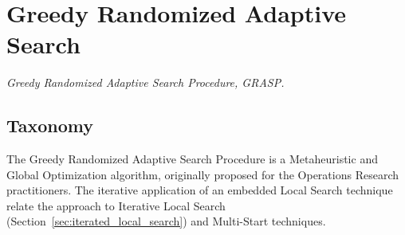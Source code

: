 

\section{Greedy Randomized Adaptive Search} 
\label{sec:grasp}

\emph{Greedy Randomized Adaptive Search Procedure, GRASP.}

\subsection{Taxonomy}
The Greedy Randomized Adaptive Search Procedure is a Metaheuristic and Global Optimization algorithm, originally proposed for the Operations Research practitioners.
The iterative application of an embedded Local Search technique relate the approach to Iterative Local Search (Section~\ref{sec:iterated_local_search}) and Multi-Start techniques.

